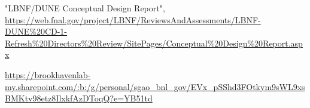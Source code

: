 \begin{thebibliography}{99}

%

%
%

%
%


%
%

%
%


%
%


%
%


%
%



 "LBNF/DUNE Conceptual Design Report",  \url{https://web.fnal.gov/project/LBNF/ReviewsAndAssessments/LBNF-DUNE\%20CD-1-Refresh\%20Directors\%20Review/SitePages/Conceptual\%20Design\%20Report.aspx}

 \url{https://brookhavenlab-my.sharepoint.com/:b:/g/personal/sgao_bnl_gov/EVx_pSShd3FOtkym9sWL9xsBMKtv98etz8IlxkfAzDToqQ?e=YB51td}




\end{thebibliography}
